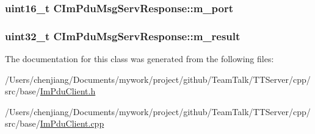 \subsubsection[{m\+\_\+port}]{\setlength{\rightskip}{0pt plus 5cm}uint16\+\_\+t C\+Im\+Pdu\+Msg\+Serv\+Response\+::m\+\_\+port\hspace{0.3cm}{\ttfamily [private]}}\label{class_c_im_pdu_msg_serv_response_a51c0147683992b49c8618ba1857cf529}
\hypertarget{class_c_im_pdu_msg_serv_response_a36b6e588eb46de8d017a13cbf225b44b}{}
\subsubsection[{m\+\_\+result}]{\setlength{\rightskip}{0pt plus 5cm}uint32\+\_\+t C\+Im\+Pdu\+Msg\+Serv\+Response\+::m\+\_\+result\hspace{0.3cm}{\ttfamily [private]}}\label{class_c_im_pdu_msg_serv_response_a36b6e588eb46de8d017a13cbf225b44b}


The documentation for this class was generated from the following files\+:\begin{DoxyCompactItemize}
\item 
/\+Users/chenjiang/\+Documents/mywork/project/github/\+Team\+Talk/\+T\+T\+Server/cpp/src/base/\hyperlink{_im_pdu_client_8h}{Im\+Pdu\+Client.\+h}\item 
/\+Users/chenjiang/\+Documents/mywork/project/github/\+Team\+Talk/\+T\+T\+Server/cpp/src/base/\hyperlink{_im_pdu_client_8cpp}{Im\+Pdu\+Client.\+cpp}\end{DoxyCompactItemize}
